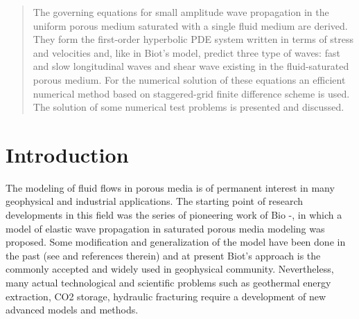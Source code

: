 \documentclass[3p,times]{elsarticle}
\begin{document}
\begin{frontmatter}
\begin{abstract}
The governing equations for small amplitude wave propagation in the uniform porous medium saturated with a single fluid medium are derived. They form the first-order hyperbolic PDE system written in terms of stress and velocities and, like in Biot’s model, predict three type of waves: fast and slow longitudinal waves and shear wave existing in the fluid-saturated porous medium. For the numerical solution of these equations an efficient numerical method based on staggered-grid finite difference scheme is used. The solution of some numerical test problems is presented and discussed.

\end{abstract}

\begin{keyword}
%
\end{keyword}
\end{frontmatter}


% 
\section{Introduction} \label{sec:introduction}
%
The modeling of fluid flows in porous media is of permanent interest in many geophysical and industrial applications. The starting point of research developments in this field was the series of pioneering work of Bio \cite{Bio}-\cite{Bio}, in which a model of elastic wave propagation in saturated porous media modeling was proposed. Some modification and generalization of the model have been done in the past (see \cite{} and references therein) and at present Biot's approach is the commonly accepted and widely used in geophysical community. Nevertheless, many actual technological and scientific problems such as geothermal energy extraction, CO2 storage, hydraulic fracturing require a development of new advanced models and methods. 
\end{document}
